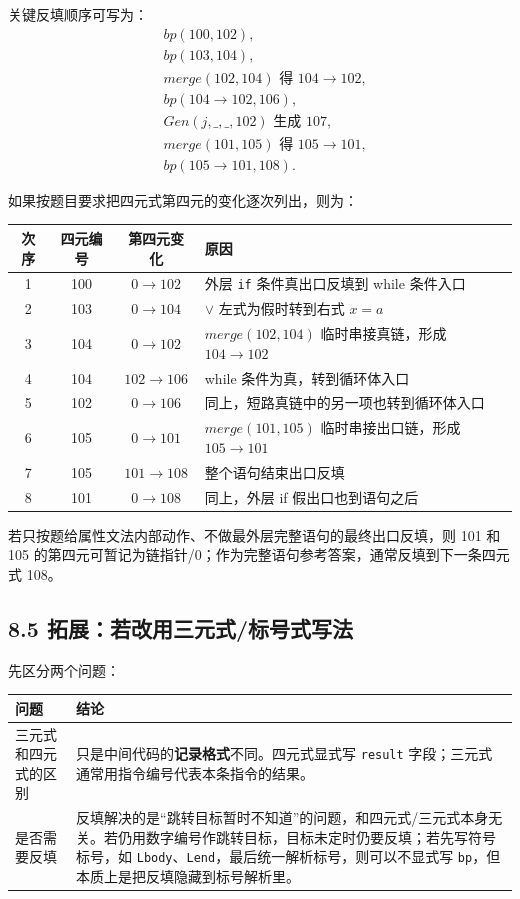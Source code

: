 \documentclass[UTF8,zihao=-4]{ctexart}
\newcommand{\kw}[1]{\texttt{#1}}
\begin{document}
关键反填顺序可写为：
\[
\begin{aligned}
&bp(100,102),\\
&bp(103,104),\\
&merge(102,104)\text{ 得 }104\to102,\\
&bp(104\to102,106),\\
&Gen(j,\_,\_,102)\text{ 生成 }107,\\
&merge(101,105)\text{ 得 }105\to101,\\
&bp(105\to101,108).
\end{aligned}
\]

如果按题目要求把四元式第四元的变化逐次列出，则为：

\begin{center}
\begin{tabular}{c|c|c|L{0.54\textwidth}}
次序 & 四元编号 & 第四元变化 & 原因\\
 & 100 & $0\to102$ & 外层 \kw{if} 条件真出口反填到 while 条件入口\\
2 & 103 & $0\to104$ & $\lor$ 左式为假时转到右式 $x=a$\\
3 & 104 & $0\to102$ & $merge(102,104)$ 临时串接真链，形成 $104\to102$\\
4 & 104 & $102\to106$ & while 条件为真，转到循环体入口\\
5 & 102 & $0\to106$ & 同上，短路真链中的另一项也转到循环体入口\\
6 & 105 & $0\to101$ & $merge(101,105)$ 临时串接出口链，形成 $105\to101$\\
7 & 105 & $101\to108$ & 整个语句结束出口反填\\
8 & 101 & $0\to108$ & 同上，外层 if 假出口也到语句之后\\
\end{tabular}
\end{center}

若只按题给属性文法内部动作、不做最外层完整语句的最终出口反填，则 101 和 105 的第四元可暂记为链指针/0；作为完整语句参考答案，通常反填到下一条四元式 108。

\subsection*{8.5 拓展：若改用三元式/标号式写法}

先区分两个问题：

\begin{center}
\begin{tabular}{L{0.32\textwidth}|L{0.58\textwidth}}
问题 & 结论\\
\hline
三元式和四元式的区别 & 只是中间代码的\textbf{记录格式}不同。四元式显式写 \kw{result} 字段；三元式通常用指令编号代表本条指令的结果。\\
是否需要反填 & 反填解决的是“跳转目标暂时不知道”的问题，和四元式/三元式本身无关。若仍用数字编号作跳转目标，目标未定时仍要反填；若先写符号标号，如 \kw{Lbody}、\kw{Lend}，最后统一解析标号，则可以不显式写 \kw{bp}，但本质上是把反填隐藏到标号解析里。\\
\end{tabular}
\end{center}
\end{document}
